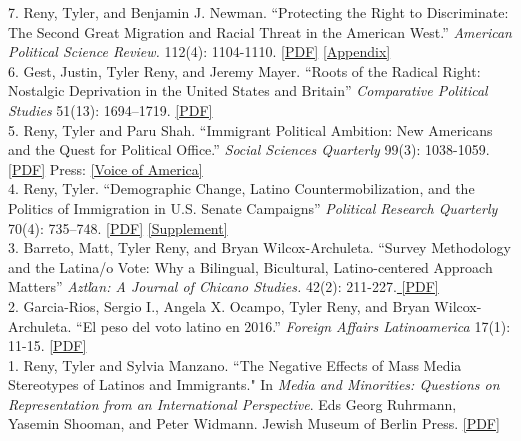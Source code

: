 \documentclass[11pt, a4paper]{article}
\newcommand{\years}[1]{\marginnote{\scriptsize #1}}
\begin{document}
\years{} 7. Reny, Tyler, and Benjamin J. Newman. ``Protecting the Right to Discriminate: The Second Great Migration and Racial Threat in the American West.'' \textit{American Political Science Review.} 112(4): 1104-1110. \href{http://tylerreny.github.io/pdf/pubs/reny_newman_apsr_2018.pdf}{[PDF]} \href{http://tylerreny.github.io/pdf/pubs/reny_newman_apsr_2018_SI.pdf}{[Appendix]}\\

\years{} 6. Gest, Justin, Tyler Reny, and Jeremy Mayer. ``Roots of the Radical Right: Nostalgic Deprivation in the United States and Britain'' \textit{Comparative Political Studies} 51(13): 1694–1719. \href{http://tylerreny.github.io/pdf/pubs/reny_2017_cps_final.pdf}{[PDF]}\\

\years{} 5. Reny, Tyler and Paru Shah. ``Immigrant Political Ambition:  New Americans and the Quest for Political Office.'' \textit{Social Sciences Quarterly} 99(3): 1038-1059.\href{http://tylerreny.github.io/pdf/pubs/reny_shah_2018_ssq_immigrant_ambition.pdf}{[PDF]} Press: \href{https://www.voanews.com/a/immigrants-candidates-make-a-run-for-it-in-upcoming-us-elections/4439132.html}{[Voice of America]}\\

\years{2017} 4. Reny, Tyler. ``Demographic Change, Latino Countermobilization, and the Politics of Immigration in U.S. Senate Campaigns'' \textit{Political Research Quarterly} 70(4): 735–748. \href{http://tylerreny.github.io/pdf/pubs/reny_2017_prq_final.pdf}{[PDF]} \href{http://tylerreny.github.io/pdf/pubs/reny_2017_prq_final_supp.pdf}{[Supplement]}\\

\years{} 3. Barreto, Matt, Tyler Reny, and Bryan Wilcox-Archuleta. ``Survey Methodology and the Latina/o Vote: Why a Bilingual, Bicultural, Latino-centered Approach Matters'' \textit{Aztl$\acute{a}$n: A Journal of Chicano Studies.} 42(2): 211-227.\href{http://tylerreny.github.io/pdf/pubs/reny_2017_aztlan_final.pdf}{ [PDF]}\\

\years{} 2. Garcia-Rios, Sergio I., Angela X. Ocampo, Tyler Reny, and Bryan Wilcox-Archuleta. ``El peso del voto latino en 2016.'' \textit{Foreign Affairs Latinoamerica} 17(1): 11-15. \href{http://tylerreny.github.io/pdf/pubs/reny_et_al_2017_foreign_affairs.pdf}{ [PDF]}\\

\years{2016} 1. Reny, Tyler and Sylvia Manzano. ``The Negative Effects of Mass Media Stereotypes of Latinos and Immigrants." In \textit{Media and Minorities: Questions on Representation from an International Perspective}. Eds Georg Ruhrmann, Yasemin Shooman, and Peter Widmann. Jewish Museum of Berlin Press. \href{http://tylerreny.github.io/pdf/pubs/reny_manzano_stereotypes_2016.pdf}{[PDF]}\\
\end{document}
